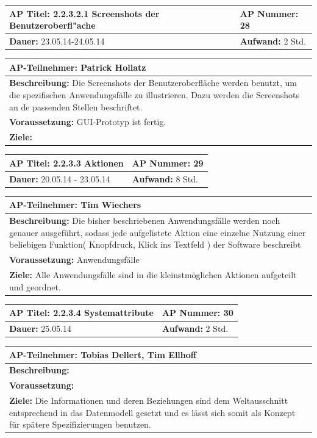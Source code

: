 \documentclass[fontsize=12pt,paper=a4,twoside]{scrartcl}
\begin{document}
\begin{tabular}{|p{7.43cm}|p{7.43cm}|}
\hline
\textbf{AP Titel: }2.2.3.2.1 Screenshots der Benutzeroberfl"ache & \textbf{AP Nummer: }28\\ 
\hline
\textbf{Dauer: } 23.05.14-24.05.14 & \textbf{Aufwand: } 2 Std.\\
\hline
\end{tabular}
\begin{tabular}{|p{15.3cm}|}
\hline
\textbf{AP-Teilnehmer: }Patrick Hollatz\\
\hline
\textbf{Beschreibung: }Die Screenshots der Benutzeroberfläche werden benutzt, um die spezifischen Anwendungsfälle zu illustrieren. Dazu werden die Screenshots an de passenden Stellen beschriftet.\\
\hline
\textbf{Voraussetzung: }GUI-Prototyp ist fertig.\\
\hline 
\textbf{Ziele: }\\
\hline 
\end{tabular}

\begin{tabular}{|p{7.43cm}|p{7.43cm}|}
\hline
\textbf{AP Titel: }2.2.3.3 Aktionen & \textbf{AP Nummer: }29\\ 
\hline
\textbf{Dauer: }20.05.14 - 23.05.14 & \textbf{Aufwand: } 8 Std.\\
\hline
\end{tabular}
\begin{tabular}{|p{15.3cm}|}
\hline
\textbf{AP-Teilnehmer: }Tim Wiechers\\
\hline
\textbf{Beschreibung: }Die bisher beschriebenen Anwendungsfälle werden noch genauer ausgeführt, sodass jede aufgelistete Aktion eine einzelne Nutzung einer beliebigen Funktion( Knopfdruck, Klick ins Textfeld ) der Software beschreibt\\
\hline
\textbf{Voraussetzung: }Anwendungsfälle\\
\hline 
\textbf{Ziele: }Alle Anwendungsfälle sind in die kleinstmöglichen Aktionen aufgeteilt und geordnet.\\
\hline 
\end{tabular}

\begin{tabular}{|p{7.43cm}|p{7.43cm}|}
\hline
\textbf{AP Titel: }2.2.3.4 Systemattribute & \textbf{AP Nummer: }30\\ 
\hline
\textbf{Dauer: }25.05.14 & \textbf{Aufwand: } 2 Std.\\
\hline
\end{tabular}
\begin{tabular}{|p{15.3cm}|}
\hline
\textbf{AP-Teilnehmer: }Tobias Dellert, Tim Ellhoff\\
\hline
\textbf{Beschreibung: }\\
\hline
\textbf{Voraussetzung: }\\
\hline 
\textbf{Ziele: }Die Informationen und deren Beziehungen sind dem Weltausschnitt entsprechend in das Datenmodell gesetzt und es lässt sich somit als Konzept für spätere Spezifizierungen benutzen.\\
\hline 
\end{tabular}
\end{document}
